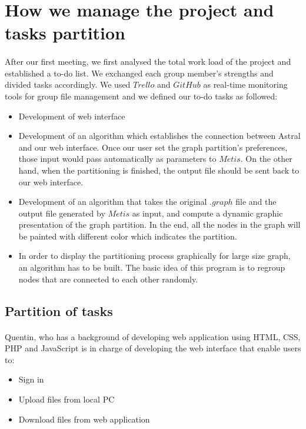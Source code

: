 \documentclass{cranfieldChart}
\begin{document}
\section{How we manage the project and tasks partition}
\paragraph{}
After our first meeting, we first analysed the total work load of the project and established a to-do list. We exchanged each group member's strengths and divided tasks accordingly. We used $Trello$ and $GitHub$ as real-time monitoring tools for group file management and we defined our to-do tasks as followed:
\begin{itemize}
    \item Development of web interface 
    \item Development of an algorithm which establishes the connection between Astral and our web interface. Once our user set the graph partition's preferences, those input would pass automatically as parameters to $Metis$. On the other hand, when the partitioning is finished, the output file should be sent back to our web interface. 
    \item Development of an algorithm that takes the original $.graph$ file and the output file generated by $Metis$ as input, and compute a dynamic graphic presentation of the graph partition. In the end, all the nodes in the graph will be painted with different color which indicates the partition. 
    \item In order to display the partitioning process graphically for large size graph, an algorithm has to be built. The basic idea of this program is to regroup nodes that are connected to each other randomly.   
\end{itemize}

\subsection{Partition of tasks} 

\paragraph{}
Quentin, who has a background of developing web application using HTML, CSS, PHP and JavaScript is in charge of developing the web interface that enable users to: 
\begin{itemize}
    \item Sign in 
    \item Upload files from local PC 
    \item Download files from web application 
\end{itemize}
\end{document}
